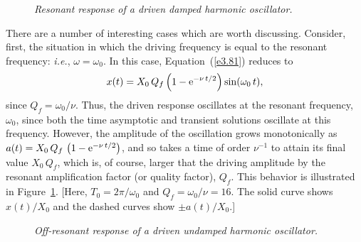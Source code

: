 \begin{figure}
\epsfysize=3in
\centerline{}
\caption{\em Resonant response of a driven damped harmonic oscillator.}\label{f3.6}   
\end{figure}

There are a number of interesting cases which are worth discussing. Consider,
first, the situation in which the driving frequency is equal to the resonant frequency: {\em i.e.},  $\omega=\omega_0$. In this case, Equation~(\ref{e3.81}) reduces to
\begin{equation}
x(t)= X_0\,Q_f\left(1-{\rm e}^{-\nu\,t/2}\right)\sin(\omega_0\,t),
\end{equation} 
since $Q_f=\omega_0/\nu$. Thus, the driven response oscillates at the
resonant frequency, $\omega_0$, since  both the time asymptotic and transient solutions
 oscillate at this frequency. However, the amplitude of the
oscillation grows monotonically as $a(t) = X_0\,Q_f\,\left(1-{\rm e}^{-\nu\,t/2}\right)$, and
so takes a time of order $\nu^{-1}$ to attain its final value $X_0\,Q_f$, which
is, of course, larger that the driving amplitude  by the resonant amplification
factor (or quality factor), $Q_f$. This behavior is illustrated in Figure~\ref{f3.6}.
[Here, $T_0=2\pi/\omega_0$ and $Q_f=\omega_0/\nu=16$. The solid curve
shows $x(t)/X_0$ and the dashed curves show $\pm a(t)/X_0$.]

\begin{figure}
\epsfysize=3in
\centerline{}
\caption{\em Off-resonant response of a driven undamped harmonic oscillator.}\label{f3.7}   
\end{figure}


